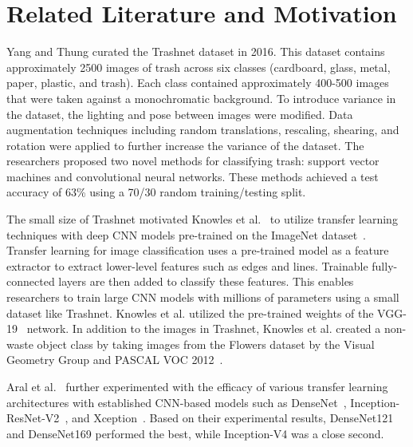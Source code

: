 \documentclass[conference]{ieeeconf}
\begin{document}
\section{Related Literature and Motivation}

Yang and Thung \cite{Yang2016} curated the Trashnet dataset in 2016. This dataset contains approximately 2500 images of trash across six classes (cardboard, glass, metal, paper, plastic, and trash). Each class contained approximately 400-500 images that were taken against a monochromatic background. To introduce variance in the dataset, the lighting and pose between images were modified. Data augmentation techniques including random translations, rescaling, shearing, and rotation were applied to further increase the variance of the dataset. The researchers proposed two novel methods for classifying trash: support vector machines and convolutional neural networks. These methods achieved a test accuracy of 63\% using a 70/30 random training/testing split. 

The small size of Trashnet motivated Knowles et al.~\cite{Knowles} to utilize transfer learning techniques with deep CNN models pre-trained on the ImageNet dataset~\cite{ImageNet}. Transfer learning for image classification uses a pre-trained model as a feature extractor to extract lower-level features such as edges and lines. Trainable fully-connected layers are then added to classify these features. This enables researchers to train large CNN models with millions of parameters using a small dataset like Trashnet. Knowles et al. utilized the pre-trained weights of the VGG-19~\cite{VGG} network. In addition to the images in Trashnet, Knowles et al. created a non-waste object class by taking images from the Flowers dataset by the Visual Geometry Group and PASCAL VOC 2012~\cite{pascal-voc-2007}.  

Aral et al.~\cite{Aral2019} further experimented with the efficacy of various transfer learning architectures with established CNN-based models such as DenseNet~\cite{DenseNet}, Inception-ResNet-V2~\cite{InceptionResNet}, and Xception~\cite{Xception}. Based on their experimental results, DenseNet121 and DenseNet169 performed the best, while Inception-V4 was a close second. 

\end{document}
